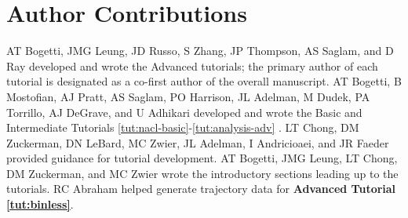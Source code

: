 \section{Author Contributions}

AT Bogetti, JMG Leung, JD Russo, S Zhang, JP Thompson, AS Saglam, and D Ray developed and wrote the Advanced tutorials; the primary author of each tutorial is designated as a co-first author of the overall manuscript. AT Bogetti, B Mostofian, AJ Pratt, AS Saglam, PO Harrison, JL Adelman, M Dudek, PA Torrillo, AJ DeGrave, and U Adhikari developed and wrote the Basic and Intermediate Tutorials \ref{tut:nacl-basic}-\ref{tut:analysis-adv} \citep{bogetti_suite_2019}.
LT Chong, DM Zuckerman, DN LeBard, MC Zwier, JL Adelman, I Andricioaei, and JR Faeder provided guidance for tutorial development. 
AT Bogetti, JMG Leung, LT Chong, DM Zuckerman, and MC Zwier wrote the introductory sections leading up to the tutorials. 
RC Abraham helped generate trajectory data for \textbf{Advanced Tutorial \ref{tut:binless}}.